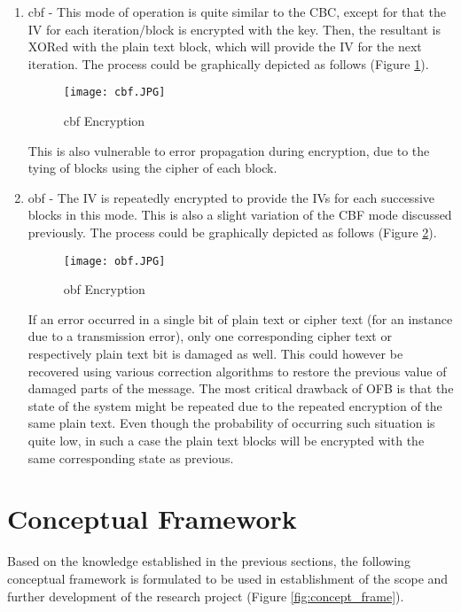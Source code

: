\begin{enumerate}
    \item \acrfull{cbf} - This mode of operation is quite similar to the CBC, except for that the IV for each iteration/block is encrypted with the key. Then, the resultant is XORed with the plain text block, which will provide the IV for the next iteration. The process could be graphically depicted as follows (Figure \ref{fig:enc_cbf}).
    
    \begin{figure}[h!]
        \texttt{[image: cbf.JPG]}
        \centering
        \caption{\acrfull{cbf} Encryption}
        \label{fig:enc_cbf}
    \end{figure}
    
    This is also vulnerable to error propagation during encryption, due to the tying of blocks using the cipher of each block. 
    
    \item \acrfull{obf} - The IV is repeatedly encrypted to provide the IVs for each successive blocks in this mode. This is also a slight variation of the CBF mode discussed previously. The process could be graphically depicted as follows (Figure \ref{fig:enc_obf}).
    
    \begin{figure}[h!]
        \texttt{[image: obf.JPG]}
        \centering
        \caption{\acrfull{obf} Encryption}
        \label{fig:enc_obf}
    \end{figure}
    
    If an error occurred in a single bit of plain text or cipher text (for an instance due to a transmission error), only one corresponding cipher text or respectively plain text bit is damaged as well. This could however be recovered using various correction algorithms to restore the previous value of damaged parts of the message. The most critical drawback of OFB is that the state of the system might be repeated due to the repeated encryption of the same plain text. Even though the probability of occurring such situation is quite low, in such a case the plain text blocks will be encrypted with the same corresponding state as previous.
\end{enumerate}

\section{Conceptual Framework}

Based on the knowledge established in the previous sections, the following conceptual framework is formulated to be used in establishment of the scope and further development of the research project (Figure \ref{fig:concept_frame}).

